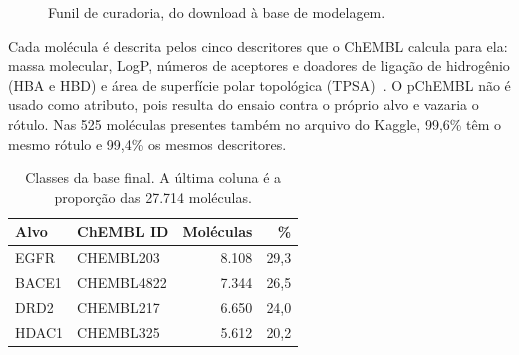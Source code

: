 \begin{figure}[ht]
\centering
{}
\caption{Funil de curadoria, do download à base de modelagem.}
\label{fig:funil}
\end{figure}

Cada molécula é descrita pelos cinco descritores que o ChEMBL calcula para ela: massa molecular, LogP, números de aceptores e doadores de ligação de hidrogênio (HBA e HBD) e área de superfície polar topológica (TPSA)~\cite{ertl:00}. O pChEMBL não é usado como atributo, pois resulta do ensaio contra o próprio alvo e vazaria o rótulo. Nas 525 moléculas presentes também no arquivo do Kaggle, 99,6\% têm o mesmo rótulo e 99,4\% os mesmos descritores.

\begin{table}[ht]
\centering
\caption{Classes da base final. A última coluna é a proporção das 27.714 moléculas.}
\label{tab:classes}
\small
\begin{tabular}{llrr}
\toprule
Alvo & ChEMBL ID & Moléculas & \% \\
\midrule
EGFR  & CHEMBL203  & 8.108 & 29,3 \\
BACE1 & CHEMBL4822 & 7.344 & 26,5 \\
DRD2  & CHEMBL217  & 6.650 & 24,0 \\
HDAC1 & CHEMBL325  & 5.612 & 20,2 \\
\bottomrule
\end{tabular}
\end{table}

